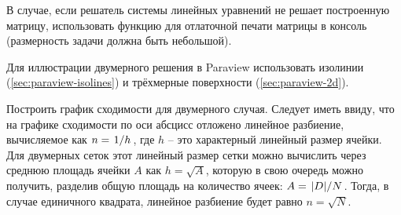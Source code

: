 В случае, если решатель системы линейных уравнений не решает построенную матрицу, использовать функцию
 для отлаточной печати матрицы в консоль (размерность задачи должна быть небольшой).

Для иллюстрации двумерного решения в Paraview использовать изолинии (\ref{sec:paraview-isolines}) и трёхмерные поверхности (\ref{sec:paraview-2d}).

Построить график сходимости для двумерного случая.
Следует иметь ввиду, что на графике сходимости
по оси абсцисс отложено линейное разбиение, вычисляемое как
$n=\left.1\middle/h\right.$, где $h$ -- это характерный линейный размер ячейки.
Для двумерных сеток этот линейный размер
сетки можно вычислить через среднюю площадь ячейки $A$ как $h = \sqrt{A}$,
которую в свою очередь можно получить, разделив общую площадь на количество
ячеек: $A = \left.|D|\middle/N\right.$. Тогда, в случае единичного квадрата, линейное разбиение будет равно $n = \sqrt{N}$.
